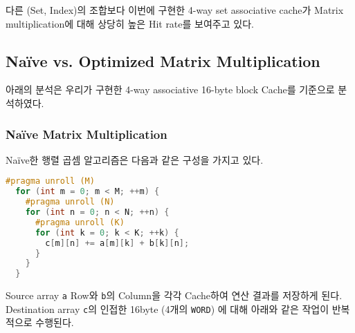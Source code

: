 \documentclass{scrartcl}
\begin{document}
다른 (Set, Index)의 조합보다 이번에 구현한 4-way set associative cache가 Matrix multiplication에 대해 상당히 높은 Hit rate를 보여주고 있다.


\subsection{Naïve vs. Optimized Matrix Multiplication}
아래의 분석은 우리가 구현한 4-way associative 16-byte block Cache를 기준으로 분석하였다.

\subsubsection{Naïve Matrix Multiplication}
Naïve한 행렬 곱셈 알고리즘은 다음과 같은 구성을 가지고 있다.
\begin{lstlisting}[language=c]
  #pragma unroll (M)
  for (int m = 0; m < M; ++m) {
    #pragma unroll (N)
    for (int n = 0; n < N; ++n) {
      #pragma unroll (K)
      for (int k = 0; k < K; ++k) {
        c[m][n] += a[m][k] + b[k][n];
      }
    }
  }  
\end{lstlisting}
Source array \texttt{a} Row와 \texttt{b}의 Column을 각각 Cache하여 연산 결과를 저장하게 된다.
Destination array \texttt{c}의 인접한 16byte (4개의 \texttt{WORD}) 에 대해 아래와 같은 작업이 반복적으로 수행된다.
\end{document}

